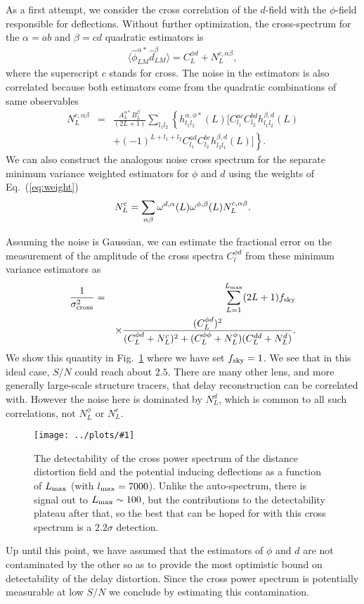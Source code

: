 \documentclass[prd,amsmath,amssymb,floatfix,superscriptaddress,nofootinbib,twocolumn]{revtex4-1}
\def\be{\begin{equation}}
\def\ee{\end{equation}}
\def\bea{\begin{eqnarray}}
\def\eea{\end{eqnarray}}
\newcommand{\ec}[1]{Eq.~(\ref{eq:#1})}
\newcommand{\eql}[1]{\label{eq:#1}}
\newcommand{\sfig}[2]{
\texttt{[image: ../plots/\#1]}
        }
\newcommand{\Sfig}[2]{
   \begin{figure}[thbp]
   \begin{center}
    \sfig{#1.pdf}{\columnwidth}
    \caption{{\small #2}}
    \label{fig:#1}
     \end{center}
   \end{figure}
}
\newcommand{\rf}[1]{\ref{fig:#1}}
\begin{document}
As a first attempt, we consider the cross correlation of the $d$-field with the $\phi$-field responsible for deflections. Without further optimization, the cross-spectrum for the $\alpha=ab$ and
$\beta=cd$ quadratic estimators is 
\bea
 \langle \hat{\phi}^{\alpha*}_{LM}\hat{d}^{\beta}_{LM} \rangle= {C}_{L}^{\phi d} +N_{L}^{c,\alpha\beta},\eql{crossn}
\eea 
where the superscript $c$ stands for cross. The noise in the estimators is also correlated because 
both estimators come from the  quadratic combinations of same observables 
\bea
N_{L}^{c,\alpha\beta}&=&\frac{A_{L}^{\alpha*}B_{L}^{\beta}}{(2L+1)}\sum_{l_{1}l_{2}}  \left\{ h_{l_{1}l_{2}}^{\alpha,\phi*} (L)\big[ C_{l_{1}}^{ac}C_{l_{2}}^{bd}h_{l_{1}l_{2}}^{\beta,d}(L)\right. \nonumber \\
&&\left. +(-1)^{L+l_{1}+l_{2}}C_{l_{1}}^{ad}C_{l_{2}}^{bc} h_{l_{2}l_{1}}^{\beta,d}(L)  \big]\right\}.
\eea
We can also construct the analogous noise cross spectrum for the separate minimum variance weighted estimators for $\phi$ and $d$  using
the weights of \ec{weight} 
\be
N^{\rm c}_L = \sum_{\alpha\beta } \omega^{d,\alpha}(L) \omega^{\phi,\beta}(L) N^{c,\alpha\beta}_L.
\ee

Assuming the noise is Gaussian, we can  estimate the fractional
error on the measurement of the amplitude of the cross spectra $C_l^{\phi d}$ from these minimum variance estimators as
\bea
\eql{sn1}
\frac{1}{\sigma_{\rm cross}^{2} }&=& \sum_{L=1}^{L_{\rm max}}(2L+1)f_{\rm sky} \\
&&\times\frac{(C_L^{\phi d})^2}{( C_L^{\phi d}+N_{L}^{ c})^2+
(C_L^{\phi\phi}+N_L^{\phi})(C_L^{dd}+N_L^{d})}. \nonumber
\eea
We show this quantity in Fig.~\rf{CrossStoN} where we have set
 $f_{\rm sky}=1$. We  see that in this ideal case, $S/N$ could reach about $2.5$. There are many other lens, and more generally large-scale structure tracers, that delay 
 reconstruction can be correlated with.  However the noise here is dominated by $N_L^d$, which is common to all such correlations, not
 $N_L^\phi$ or $N_L^c$.
  
 
 \Sfig{CrossStoN}{The detectability of the cross power spectrum of the distance distortion field and the potential inducing deflections as a function of $L_{\rm max}$ (with  $l_{\rm max}=7000$). Unlike the auto-spectrum, there is signal out to $L_{\rm max}\sim 100$, but the contributions to the detectability plateau after that, so the best that can be hoped for with this cross spectrum is a $2.2\sigma$ detection.}

 
Up until this point, we have assumed that the estimators of $\phi$ and $d$ are not 
 contaminated by the other so as to provide the most optimistic bound on detectability of the
 delay distortion.   Since the cross power spectrum is potentially measurable at low $S/N$ we
 conclude by estimating this contamination.
 
\end{document}
